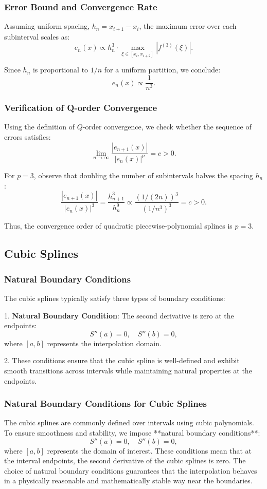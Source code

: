 \documentclass{article}
\begin{document}
\subsubsection{Error Bound and Convergence Rate}
Assuming uniform spacing, $h_n = x_{i+1} - x_i$, the maximum error over each subinterval scales as:
\[
e_n(x) \propto h_n^3 \cdot \max_{\xi \in [x_i, x_{i+2}]} |f^{(3)}(\xi)|.
\]

Since $h_n$ is proportional to $1/n$ for a uniform partition, we conclude:
\[
e_n(x) \propto \frac{1}{n^3}.
\]

\subsubsection{Verification of Q-order Convergence}
Using the definition of $Q$-order convergence, we check whether the sequence of errors satisfies:
\[
\lim_{n \to \infty} \frac{|e_{n+1}(x)|}{|e_n(x)|^p} = c > 0.
\]

For $p = 3$, observe that doubling the number of subintervals halves the spacing $h_n$:
\[
\frac{|e_{n+1}(x)|}{|e_n(x)|^3} = \frac{h_{n+1}^3}{h_n^9} \propto \frac{(1/(2n))^3}{(1/n^3)^3} = c > 0.
\]

Thus, the convergence order of quadratic piecewise-polynomial splines is $p = 3$.

\subsection{Cubic Splines}
\subsubsection{Natural Boundary Conditions}
The cubic splines typically satisfy three types of boundary conditions:\par
1. \textbf{Natural Boundary Condition}: The second derivative is zero at the endpoints:
   \[
   S''(a) = 0, \quad S''(b) = 0,
   \]
   where \([a, b]\) represents the interpolation domain.\par
2. These conditions ensure that the cubic spline is well-defined and exhibit smooth transitions across intervals while maintaining natural properties at the endpoints.

\subsubsection{Natural Boundary Conditions for Cubic Splines}
The cubic splines are commonly defined over intervals using cubic polynomials. To ensure smoothness and stability, we impose **natural boundary conditions**:
\[
S''(a) = 0, \quad S''(b) = 0,
\]
where \( [a, b] \) represents the domain of interest. These conditions mean that at the interval endpoints, the second derivative of the cubic splines is zero. The choice of natural boundary conditions guarantees that the interpolation behaves in a physically reasonable and mathematically stable way near the boundaries.
\end{document}
